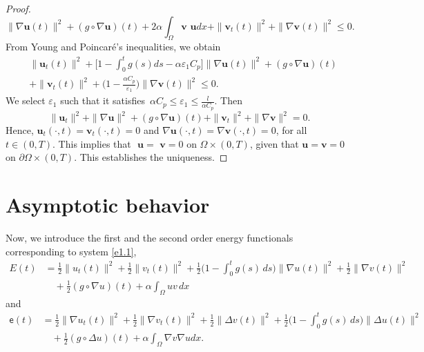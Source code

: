 \documentclass[reqno]{amsart}
\begin{document}
\begin{proof}
\[ \| \nabla \mathbf{u}(t) \|^2 +(g\circ \nabla \mathbf{u})(t)
 +2 \alpha \int_\Omega \mathbf{v}\textbf{ u}dx
 +\| \mathbf{v}_{t} (t)\|^2 + \| \nabla \mathbf{v}(t) \|^2 \leq 0.
\]
 From Young and Poincar\'e's inequalities, we obtain
\begin{align*}
&\| \mathbf{u}_{t}(t) \| ^2+ \Big[ 1-\int_0^t g(s) ds
 -\alpha \varepsilon_{1} C_p \Big] \| \nabla \mathbf{u}(t) \|^2
 +(g\circ \nabla \mathbf{u})(t)\\
&+\| \mathbf{v}_{t}(t) \|^2 + \Big( 1-\frac{\alpha C_{p}}{\varepsilon_{1} }\Big)
\| \nabla \mathbf{v}(t) \|^2 \leq 0.
\end{align*}
We select $\varepsilon_{1}$ such that it satisfies\,
$\alpha C_p \leq \varepsilon_{1}\leq \frac{l}{\alpha C_p}$. Then
\[
 \| \mathbf{u}_{t} \|^2 + \| \nabla \mathbf{u} \|^2
 +(g\circ\nabla \mathbf{u})(t)+\| \mathbf{v}_{t} \|^2 + \| \nabla \mathbf{v} \|^2=0.
\]
Hence, \( \mathbf{u}_t(\cdot, t) = \mathbf{v}_t(\cdot, t) = 0 \) and
\( \nabla \mathbf{u}(\cdot, t) = \nabla\mathbf{v}(\cdot, t) = 0 \), for all
\( t \in (0, T) \). This implies that \( \textbf{ u} = \textbf{ v} = 0 \) on
\( \Omega \times (0, T) \), given that \( \mathbf{u} = \mathbf{v} = 0 \) on
\( \partial\Omega \times (0, T) \). This establishes the uniqueness.
\end{proof}

\section{Asymptotic behavior}

Now, we introduce the first and the second order energy functionals corresponding
to system \eqref{e1.1},
\begin{equation}
\begin{aligned}
E(t) &= \frac{1}{2} \| u_t(t) \|^2 + \frac{1}{2} \| v_t(t) \|^2
 + \frac{1}{2} \Big(1 - \int_0^t g(s) \, ds \Big) \| \nabla u(t) \|^2
 + \frac{1}{2} \| \nabla v(t) \|^2 \\
&\quad + \frac{1}{2} (g \circ \nabla u)(t) + \alpha \int_{\Omega} u v \, dx\label{e4.1}
\end{aligned}
\end{equation}
and
\begin{equation}
\begin{aligned}
 \mathsf{e}(t)
& = \frac{1}{2}\| \nabla u_t(t) \|^2+\frac{1}{2}\| \nabla v_t(t) \|^2
 +\frac{1}{2} \| \Delta v(t) \|^2
 + \frac{1}{2}\Big(1 - \int_0^t g(s) \, ds \Big) \| \Delta u(t) \|^2\\
&\quad + \frac{1}{2}(g \circ \Delta u)(t)
 + \alpha \int_{\Omega}\nabla v \nabla u dx.
\end{aligned}\label{e4.2}
\end{equation}
\end{document}
